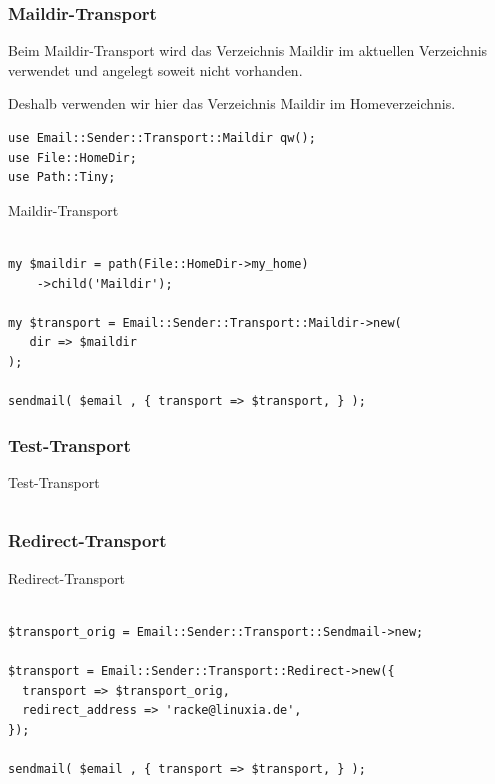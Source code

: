 \subsubsection{Maildir-Transport}

Beim Maildir-Transport wird das Verzeichnis Maildir im aktuellen Verzeichnis
verwendet und angelegt soweit nicht vorhanden.

Deshalb verwenden wir hier das Verzeichnis Maildir im Homeverzeichnis.

\begin{lstlisting}
use Email::Sender::Transport::Maildir qw();
use File::HomeDir;
use Path::Tiny;
\end{lstlisting}

\begin{frame}[fragile]{Maildir-Transport}
  \begin{verbatim}

my $maildir = path(File::HomeDir->my_home)
    ->child('Maildir');

my $transport = Email::Sender::Transport::Maildir->new(
   dir => $maildir
);

sendmail( $email , { transport => $transport, } );

\end{verbatim}
\end{frame}

\subsubsection{Test-Transport}

\begin{frame}[fragile]{Test-Transport}
\begin{verbatim}

\end{verbatim}
\end{frame}

\subsubsection{Redirect-Transport}

\begin{frame}[fragile]{Redirect-Transport}
  \begin{verbatim}

$transport_orig = Email::Sender::Transport::Sendmail->new;

$transport = Email::Sender::Transport::Redirect->new({
  transport => $transport_orig,
  redirect_address => 'racke@linuxia.de',
});

sendmail( $email , { transport => $transport, } );

\end{verbatim}
\end{frame}

